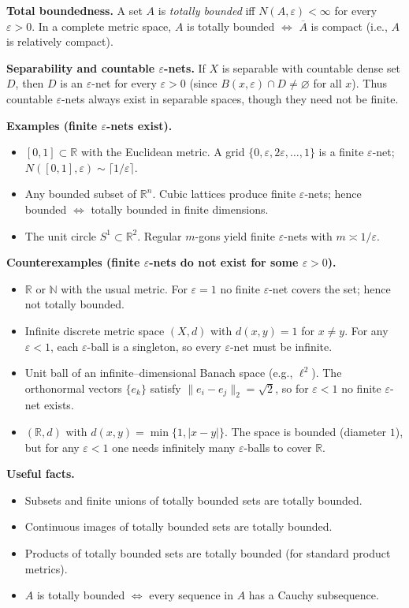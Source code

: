 \documentclass[12pt,a4paper]{article}
\begin{document}
	\medskip
	\textbf{Total boundedness.}
	A set $A$ is \emph{totally bounded} iff $N(A,\varepsilon)<\infty$ for every $\varepsilon>0$.
	In a complete metric space, $A$ is totally bounded $\iff$ $\overline{A}$ is compact (i.e., $A$ is relatively compact).
	
	\medskip
	\textbf{Separability and countable $\varepsilon$-nets.}
	If $X$ is separable with countable dense set $D$, then $D$ is an $\varepsilon$-net for every $\varepsilon>0$ (since $B(x,\varepsilon)\cap D\neq\varnothing$ for all $x$).
	Thus countable $\varepsilon$-nets always exist in separable spaces, though they need not be finite.
	
	\medskip
	\textbf{Examples (finite $\varepsilon$-nets exist).}
	\begin{itemize}
		\item $[0,1]\subset\mathbb R$ with the Euclidean metric. A grid $\{0,\varepsilon,2\varepsilon,\dots,1\}$ is a finite $\varepsilon$-net; $N([0,1],\varepsilon)\sim \lceil 1/\varepsilon\rceil$.
		\item Any bounded subset of $\mathbb R^n$. Cubic lattices produce finite $\varepsilon$-nets; hence bounded $\iff$ totally bounded in finite dimensions.
		\item The unit circle $S^1\subset\mathbb R^2$. Regular $m$-gons yield finite $\varepsilon$-nets with $m\asymp 1/\varepsilon$.
	\end{itemize}
	
	\medskip
	\textbf{Counterexamples (finite $\varepsilon$-nets do not exist for some $\varepsilon>0$).}
	\begin{itemize}
		\item $\mathbb R$ or $\mathbb N$ with the usual metric. For $\varepsilon=1$ no finite $\varepsilon$-net covers the set; hence not totally bounded.
		\item Infinite discrete metric space $(X,d)$ with $d(x,y)=1$ for $x\neq y$. For any $\varepsilon<1$, each $\varepsilon$-ball is a singleton, so every $\varepsilon$-net must be infinite.
		\item Unit ball of an infinite--dimensional Banach space (e.g., $\ell^2$). The orthonormal vectors $\{e_k\}$ satisfy $\|e_i-e_j\|_2=\sqrt 2$, so for $\varepsilon<1$ no finite $\varepsilon$-net exists.
		\item $(\mathbb R,d)$ with $d(x,y)=\min\{1,|x-y|\}$. The space is bounded (diameter $1$), but for any $\varepsilon<1$ one needs infinitely many $\varepsilon$-balls to cover $\mathbb R$.
	\end{itemize}
	
	\medskip
	\textbf{Useful facts.}
	\begin{itemize}
		\item Subsets and finite unions of totally bounded sets are totally bounded.
		\item Continuous images of totally bounded sets are totally bounded.
		\item Products of totally bounded sets are totally bounded (for standard product metrics).
		\item $A$ is totally bounded $\iff$ every sequence in $A$ has a Cauchy subsequence.
	\end{itemize}
	
	
\end{document}
